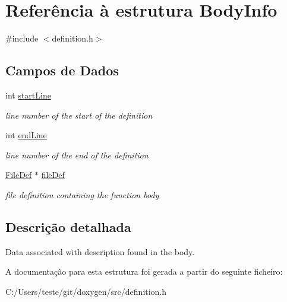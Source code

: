 \hypertarget{struct_body_info}{\section{Referência à estrutura Body\-Info}
\label{struct_body_info}
}


{\ttfamily \#include $<$definition.\-h$>$}

\subsection*{Campos de Dados}
\begin{DoxyCompactItemize}
\item 
\hypertarget{struct_body_info_aae69f615454d4cce6fddf760c20e9eb2}{int \hyperlink{struct_body_info_aae69f615454d4cce6fddf760c20e9eb2}{start\-Line}}\label{struct_body_info_aae69f615454d4cce6fddf760c20e9eb2}

\begin{DoxyCompactList}\small\item\em line number of the start of the definition \end{DoxyCompactList}\item 
\hypertarget{struct_body_info_ae558febfd4bb35f2cb24e572579516ba}{int \hyperlink{struct_body_info_ae558febfd4bb35f2cb24e572579516ba}{end\-Line}}\label{struct_body_info_ae558febfd4bb35f2cb24e572579516ba}

\begin{DoxyCompactList}\small\item\em line number of the end of the definition \end{DoxyCompactList}\item 
\hypertarget{struct_body_info_a2e1ae363ea84baa4340319bb5a163f25}{\hyperlink{class_file_def}{File\-Def} $\ast$ \hyperlink{struct_body_info_a2e1ae363ea84baa4340319bb5a163f25}{file\-Def}}\label{struct_body_info_a2e1ae363ea84baa4340319bb5a163f25}

\begin{DoxyCompactList}\small\item\em file definition containing the function body \end{DoxyCompactList}\end{DoxyCompactItemize}


\subsection{Descrição detalhada}
Data associated with description found in the body. 

A documentação para esta estrutura foi gerada a partir do seguinte ficheiro\-:\begin{DoxyCompactItemize}
\item 
C\-:/\-Users/teste/git/doxygen/src/definition.\-h\end{DoxyCompactItemize}

